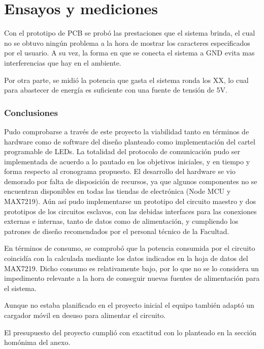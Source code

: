 \clearpage



\clearpage
\part{Ensayos y mediciones}\label{part:ensayos}
Con el prototipo de PCB se probó las prestaciones que el sistema brinda, el cual no se obtuvo ningún problema a la hora de mostrar los caracteres especificados por el usuario. A su vez, la forma en que se conecta el sistema a GND evita mas interferencias que hay en el ambiente.

Por otra parte, se midió la potencia que gasta el sistema ronda los XX, lo cual para abastecer de energía es suficiente con una fuente de tensión de 5V. 

\section{Conclusiones}

Pudo comprobarse a través de este proyecto la viabilidad tanto en términos de hardware como de software del diseño planteado como implementación del cartel programable de LEDs. 
La totalidad del protocolo de comunicación pudo ser implementada de acuerdo a lo pautado en los objetivos iniciales, y en tiempo y forma respecto al cronograma propuesto. El desarrollo del hardware se vio demorado por falta de disposición de recursos, ya que algunos componentes no se encuentran disponibles en todas las tiendas de electrónica (Node MCU y MAX7219). Aún así pudo implementarse un prototipo del circuito maestro y dos prototipos de los circuitos esclavos, con las debidas interfaces para las conexiones externas e internas, tanto de datos como de alimentación, y cumpliendo los patrones de diseño recomendados por el personal técnico de la Facultad.

En términos de consumo, se comprobó que la potencia consumida por el circuito coincidía con la calculada mediante los datos indicados en la hoja de datos del MAX7219. Dicho consumo es relativamente bajo, por lo que no se lo considera un impedimento relevante a la hora de conseguir nuevas fuentes de alimentación para el sistema. 

Aunque no estaba planificado en el proyecto inicial el equipo también adaptó un cargador móvil en desuso para alimentar el circuito.

El presupuesto del proyecto cumplió con exactitud con lo planteado en la sección homónima del anexo.
